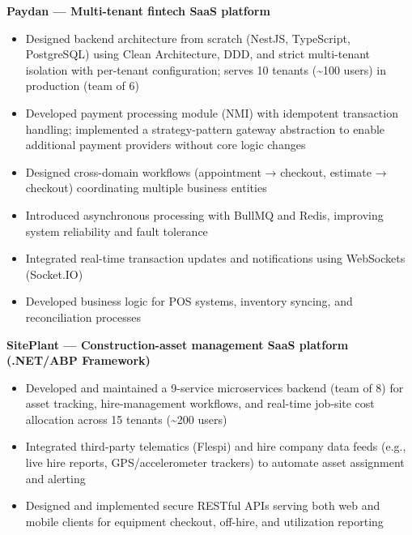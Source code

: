 \documentclass[a4paper]{article}
\newcommand{\jobProject}[1]{%
  {\leftskip=6pt\fontsize{8.5pt}{10pt}\selectfont\bfseries #1\par}%
  \vspace{1.7pt}%
}
\newenvironment{dashBullets}{%
  \begin{itemize}[
    leftmargin=16.2pt,
    label={\textendash},
    itemsep=0.9pt,
    topsep=0pt,
    parsep=0pt,
    partopsep=0pt
  ]%
  \fontsize{8.5pt}{9.9pt}\selectfont
}{%
  \end{itemize}%
}
\begin{document}
\jobProject{Paydan — Multi-tenant fintech SaaS platform}
\begin{dashBullets}                                                                                                                                                                                          
	\item Designed backend architecture from scratch (NestJS, TypeScript, PostgreSQL) using Clean Architecture,
	DDD, and strict multi-tenant isolation with per-tenant configuration; serves 10 tenants (\textasciitilde100 users) in production (team of 6)                                                                                        
	\item Developed payment processing module (NMI) with idempotent transaction handling; implemented
	a strategy-pattern gateway abstraction to enable additional payment providers without core logic changes
	\item Designed cross-domain workflows (appointment → checkout, estimate → checkout) coordinating multiple business entities
	\item Introduced asynchronous processing with BullMQ and Redis, improving system reliability and fault tolerance
	\item Integrated real-time transaction updates and notifications using WebSockets (Socket.IO)
	\item Developed business logic for POS systems, inventory syncing, and reconciliation processes                                                                                                                
	\end{dashBullets}

\vspace{4.0pt}

\jobProject{SitePlant — Construction-asset management SaaS platform (.NET/ABP Framework)}
\begin{dashBullets}
  \item Developed and maintained a 9-service microservices backend (team of 8) for asset tracking,
  hire-management workflows, and real-time job‐site cost allocation across 15 tenants (\textasciitilde200 users)
  \item Integrated third-party telematics (Flespi) and hire company data feeds (e.g., live hire reports, GPS/accelerometer trackers) to automate asset assignment and alerting
  \item Designed and implemented secure RESTful APIs serving both web and mobile clients for equipment checkout, off-hire, and utilization reporting
\end{dashBullets}
\end{document}
